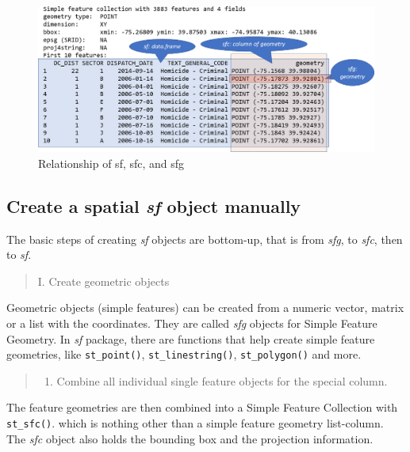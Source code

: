 \documentclass[
  11pt,
]{book}
\providecommand{\tightlist}{%
  \setlength{\itemsep}{0pt}\setlength{\parskip}{0pt}}
\begin{document}
\begin{figure}
\includegraphics[width=1\linewidth]{img/sf_sfc_sfg} \caption{Relationship of sf, sfc, and sfg}\label{fig:sf-sfc-sfg}
\end{figure}

\hypertarget{create-a-spatial-sf-object-manually}{%
\subsection{\texorpdfstring{Create a spatial \emph{sf} object manually}{Create a spatial sf object manually}}\label{create-a-spatial-sf-object-manually}}

The basic steps of creating \emph{sf} objects are bottom-up, that is from \emph{sfg}, to \emph{sfc}, then to \emph{sf}.

\begin{quote}
I. Create geometric objects
\end{quote}

Geometric objects (simple features) can be created from a numeric vector, matrix or a list with the coordinates. They are called \emph{sfg} objects for Simple Feature Geometry. In \emph{sf} package, there are functions that help create simple feature geometries, like \texttt{st\_point()}, \texttt{st\_linestring()}, \texttt{st\_polygon()} and more.

\begin{quote}
\begin{enumerate}
\def\labelenumi{\Roman{enumi}.}
\setcounter{enumi}{1}
\tightlist
\item
  Combine all individual single feature objects for the special column.
\end{enumerate}
\end{quote}

The feature geometries are then combined into a Simple Feature Collection with \texttt{st\_sfc()}. which is nothing other than a simple feature geometry list-column. The \emph{sfc} object also holds the bounding box and the projection information.
\end{document}
